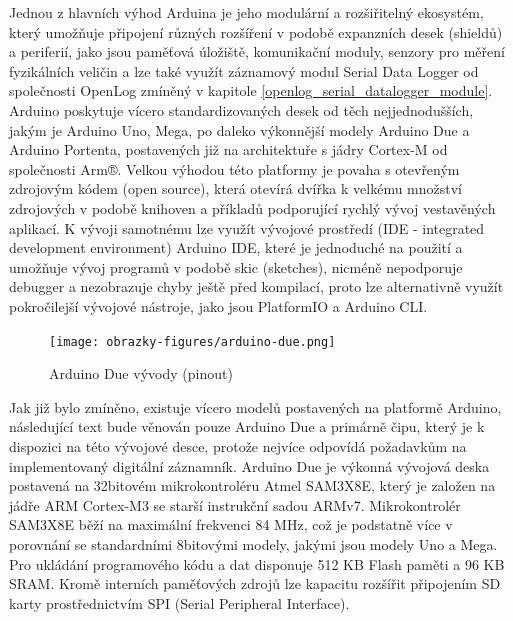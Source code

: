 Jednou z hlavních výhod Arduina je jeho modulární a rozšiřitelný ekosystém, který umožňuje připojení různých rozšíření v podobě expanzních desek (shieldů) a periferií, jako jsou paměťová úložiště, komunikační moduly, senzory pro měření fyzikálních veličin a lze také využít záznamový modul Serial Data Logger od společnosti OpenLog zmíněný v kapitole \ref{openlog_serial_datalogger_module}. Arduino poskytuje vícero standardizovaných desek od těch nejjednodušších, jakým je Arduino Uno, Mega, po daleko výkonnější modely Arduino Due a Arduino Portenta, postavených již na architektuře s jádry Cortex-M od společnosti Arm®. Velkou výhodou této platformy je povaha s otevřeným zdrojovým kódem (open source), která otevírá dvířka k velkému množství zdrojových v podobě knihoven a příkladů podporující rychlý vývoj vestavěných aplikací. K vývoji samotnému lze využít vývojové prostředí (IDE - integrated development environment) Arduino IDE, které je jednoduché na použití a umožňuje vývoj programů v podobě skic (sketches), nicméně nepodporuje debugger a nezobrazuje chyby ještě před kompilací, proto lze alternativně využít pokročilejší vývojové nástroje, jako jsou PlatformIO a Arduino CLI.

\begin{figure}[h]
    \centering
    \texttt{[image: obrazky-figures/arduino-due.png]}
    
    \caption{Arduino Due vývody (pinout) \cite{arduino_shop_due}}
    \label{fig:arduino-due-pinout}
\end{figure}


Jak již bylo zmíněno, existuje vícero modelů postavených na platformě Arduino, následující text bude věnován pouze Arduino Due a primárně čipu, který je k dispozici na této vývojové desce, protože nejvíce odpovídá požadavkům na implementovaný digitální záznamník. Arduino Due je výkonná vývojová deska postavená na 32bitovém mikrokontroléru Atmel SAM3X8E, který je založen na jádře ARM Cortex-M3 se starší instrukční sadou ARMv7. Mikrokontrolér SAM3X8E běží na maximální frekvenci 84 MHz, což je podstatně více v porovnání se  standardními 8bitovými modely, jakými jsou modely Uno a Mega. Pro ukládání programového kódu a dat disponuje 512 KB Flash paměti a 96 KB SRAM. Kromě interních paměťových zdrojů lze kapacitu rozšířit připojením SD karty prostřednictvím SPI (Serial Peripheral Interface). \cite{arduino_shop_due, arduino_shop_due}

